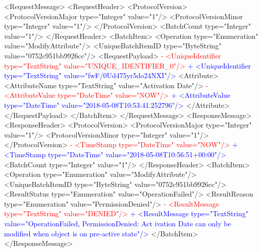  \newpage
 <RequestMessage>
   <RequestHeader>
     <ProtocolVersion>
       <ProtocolVersionMajor type="Integer" value="1"/>
       <ProtocolVersionMinor type="Integer" value="1"/>
     </ProtocolVersion>
     <BatchCount type="Integer" value="1"/>
   </RequestHeader>
   <BatchItem>
     <Operation type="Enumeration" value="ModifyAttribute"/>
     <UniqueBatchItemID type="ByteString" value="0752c951bb9926cc"/>
     <RequestPayload>
\textcolor{red}{-      <UniqueIdentifier type="TextString" value="UNIQUE_IDENTIFIER_0"/>}
\textcolor{blue}{+      <UniqueIdentifier type="TextString" value="fwF/0Ud475yr5do24NXI"/>}
       <Attribute>
         <AttributeName type="TextString" value="Activation Date"/>
\textcolor{red}{-        <AttributeValue type="DateTime" value="NOW"/>}
\textcolor{blue}{+        <AttributeValue type="DateTime" value="2018-05-08T10:53:41.252796"/>}
       </Attribute>
     </RequestPayload>
   </BatchItem>
 </RequestMessage>
 <ResponseMessage>
   <ResponseHeader>
     <ProtocolVersion>
       <ProtocolVersionMajor type="Integer" value="1"/>
       <ProtocolVersionMinor type="Integer" value="1"/>
     </ProtocolVersion>
\textcolor{red}{-    <TimeStamp type="DateTime" value="NOW"/>}
\textcolor{blue}{+    <TimeStamp type="DateTime" value="2018-05-08T10:56:51+00:00"/>}
     <BatchCount type="Integer" value="1"/>
   </ResponseHeader>
   <BatchItem>
     <Operation type="Enumeration" value="ModifyAttribute"/>
     <UniqueBatchItemID type="ByteString" value="0752c951bb9926cc"/>
     <ResultStatus type="Enumeration" value="OperationFailed"/>
     <ResultReason type="Enumeration" value="PermissionDenied"/>
\textcolor{red}{-    <ResultMessage type="TextString" value="DENIED"/>}
\textcolor{blue}{+    <ResultMessage type="TextString" value="OperationFailed, PermissionDenied: Act
ivation Date can only be modified when object is on pre-active state"/>}
   </BatchItem>
 </ResponseMessage>
 
